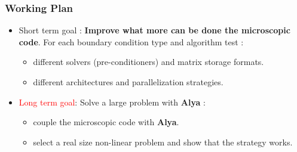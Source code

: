\documentclass[usenames,dvipsnames]{beamer}
\begin{document}

\begin{frame}
\frametitle{Working Plan}

\begin{itemize}
\item \textcolor{OliveGreen}{Short term goal} : \textbf{Improve  what more can be done the microscopic code}. 
For each boundary condition type and algorithm test :
 \begin{itemize}
  \item different solvers (pre-conditioners) and matrix storage formats.
  \item different architectures and parallelization strategies.
 \end{itemize}

 \item \textcolor{Red}{Long term goal}: Solve a large problem with \textbf{Alya} :
 \begin{itemize}
  \item couple the microscopic code with \textbf{Alya}.
  \item select a real size non-linear problem and show that the strategy works.
 \end{itemize}
\end{itemize}

\begin{figure}[hhh!]
\begin{center}
\end{center}
\end{figure}

\end{frame}
\end{document}
